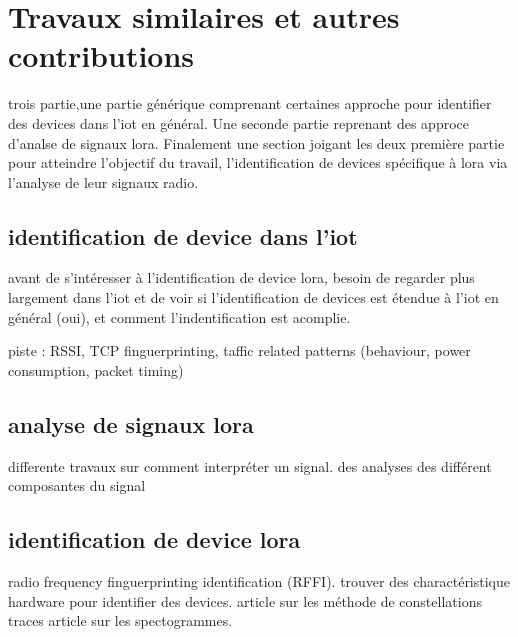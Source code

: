 \chapter{Travaux similaires et autres contributions}

trois partie,une partie générique comprenant certaines approche pour identifier des devices dans l'iot en général. Une seconde partie reprenant des approce d'analse de signaux lora. Finalement une section joigant les deux première partie pour atteindre l'objectif du travail, l'identification de devices spécifique à lora via l'analyse de leur signaux radio.


\section{identification de device dans l'iot}

avant de s'intéresser à l'identification de device lora, besoin de regarder plus largement dans l'iot et de voir si l'identification de devices est étendue à l'iot en général (oui), et comment l'indentification est acomplie.

piste : RSSI, TCP finguerprinting, taffic related patterns (behaviour, power consumption, packet timing) 

\section{analyse de signaux lora}

differente travaux sur comment interpréter un signal. des analyses des différent composantes du signal 

\section{identification de device lora}

radio frequency finguerprinting identification (RFFI). trouver des charactéristique hardware pour identifier des devices.
article sur les méthode de constellations traces
article sur les spectogrammes.